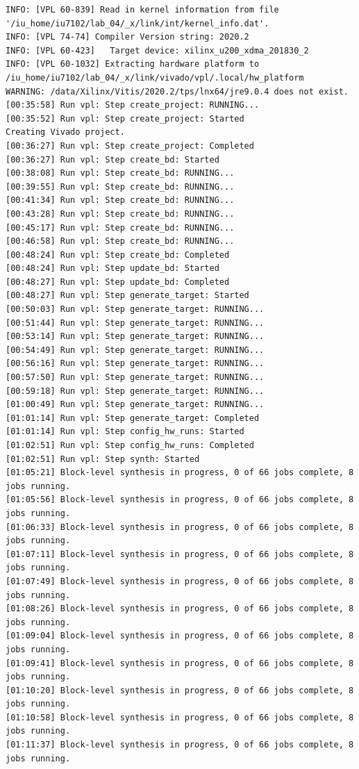 \begin{lstlisting}[label=code, basicstyle=\tiny, caption=Листинг файла v++\_vinc.log]
INFO: [VPL 60-839] Read in kernel information from file '/iu_home/iu7102/lab_04/_x/link/int/kernel_info.dat'.
INFO: [VPL 74-74] Compiler Version string: 2020.2
INFO: [VPL 60-423]   Target device: xilinx_u200_xdma_201830_2
INFO: [VPL 60-1032] Extracting hardware platform to /iu_home/iu7102/lab_04/_x/link/vivado/vpl/.local/hw_platform
WARNING: /data/Xilinx/Vitis/2020.2/tps/lnx64/jre9.0.4 does not exist.
[00:35:58] Run vpl: Step create_project: RUNNING...
[00:35:52] Run vpl: Step create_project: Started
Creating Vivado project.
[00:36:27] Run vpl: Step create_project: Completed
[00:36:27] Run vpl: Step create_bd: Started
[00:38:08] Run vpl: Step create_bd: RUNNING...
[00:39:55] Run vpl: Step create_bd: RUNNING...
[00:41:34] Run vpl: Step create_bd: RUNNING...
[00:43:28] Run vpl: Step create_bd: RUNNING...
[00:45:17] Run vpl: Step create_bd: RUNNING...
[00:46:58] Run vpl: Step create_bd: RUNNING...
[00:48:24] Run vpl: Step create_bd: Completed
[00:48:24] Run vpl: Step update_bd: Started
[00:48:27] Run vpl: Step update_bd: Completed
[00:48:27] Run vpl: Step generate_target: Started
[00:50:03] Run vpl: Step generate_target: RUNNING...
[00:51:44] Run vpl: Step generate_target: RUNNING...
[00:53:14] Run vpl: Step generate_target: RUNNING...
[00:54:49] Run vpl: Step generate_target: RUNNING...
[00:56:16] Run vpl: Step generate_target: RUNNING...
[00:57:50] Run vpl: Step generate_target: RUNNING...
[00:59:18] Run vpl: Step generate_target: RUNNING...
[01:00:49] Run vpl: Step generate_target: RUNNING...
[01:01:14] Run vpl: Step generate_target: Completed
[01:01:14] Run vpl: Step config_hw_runs: Started
[01:02:51] Run vpl: Step config_hw_runs: Completed
[01:02:51] Run vpl: Step synth: Started
[01:05:21] Block-level synthesis in progress, 0 of 66 jobs complete, 8 jobs running.
[01:05:56] Block-level synthesis in progress, 0 of 66 jobs complete, 8 jobs running.
[01:06:33] Block-level synthesis in progress, 0 of 66 jobs complete, 8 jobs running.
[01:07:11] Block-level synthesis in progress, 0 of 66 jobs complete, 8 jobs running.
[01:07:49] Block-level synthesis in progress, 0 of 66 jobs complete, 8 jobs running.
[01:08:26] Block-level synthesis in progress, 0 of 66 jobs complete, 8 jobs running.
[01:09:04] Block-level synthesis in progress, 0 of 66 jobs complete, 8 jobs running.
[01:09:41] Block-level synthesis in progress, 0 of 66 jobs complete, 8 jobs running.
[01:10:20] Block-level synthesis in progress, 0 of 66 jobs complete, 8 jobs running.
[01:10:58] Block-level synthesis in progress, 0 of 66 jobs complete, 8 jobs running.
[01:11:37] Block-level synthesis in progress, 0 of 66 jobs complete, 8 jobs running.

\end{lstlisting}
